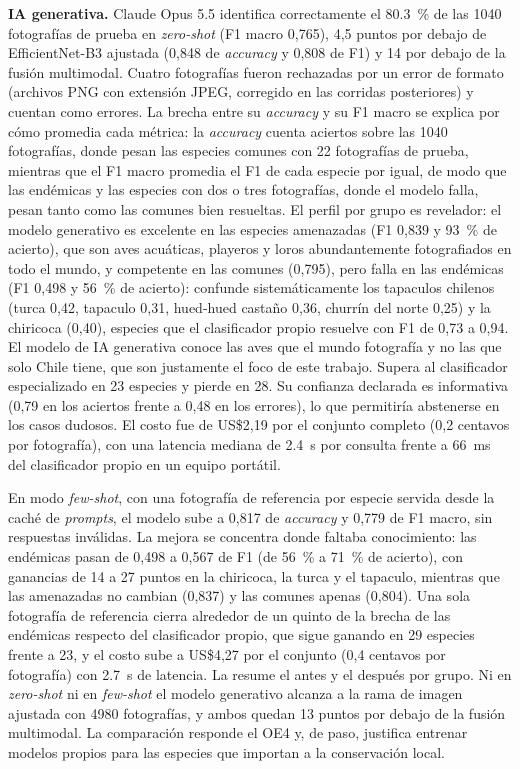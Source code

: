 \textbf{IA generativa.} Claude Opus 5.5 identifica correctamente el
\SI{80,3}{\percent} de las \num{1040} fotografías de prueba en
\textit{zero-shot} (F1 macro 0,765), 4,5 puntos por debajo de
EfficientNet-B3 ajustada (0,848 de \textit{accuracy} y 0,808 de F1) y 14 por
debajo de la fusión multimodal. Cuatro fotografías fueron rechazadas por un
error de formato (archivos PNG con extensión JPEG, corregido en las corridas
posteriores) y cuentan como errores. La brecha entre su \textit{accuracy} y su F1 macro se explica por
cómo promedia cada métrica: la \textit{accuracy} cuenta aciertos sobre las
\num{1040} fotografías, donde pesan las especies comunes con 22 fotografías
de prueba, mientras que el F1 macro promedia el F1 de cada especie por
igual, de modo que las endémicas y las especies con dos o tres fotografías,
donde el modelo falla, pesan tanto como las comunes bien resueltas. El perfil por grupo es revelador: el modelo generativo
es excelente en las especies amenazadas (F1 0,839 y \SI{93}{\percent} de
acierto), que son aves acuáticas, playeros y loros abundantemente
fotografiados en todo el mundo, y competente en las comunes (0,795), pero
falla en las endémicas (F1 0,498 y \SI{56}{\percent} de acierto): confunde
sistemáticamente los tapaculos chilenos (turca 0,42, tapaculo 0,31, hued-hued
castaño 0,36, churrín del norte 0,25) y la chiricoca (0,40), especies que el
clasificador propio resuelve con F1 de 0,73 a 0,94. El modelo de IA generativa conoce las aves que el mundo fotografía y no las que solo Chile
tiene, que son justamente el foco de este trabajo. Supera al clasificador
especializado en 23 especies y pierde en 28. Su confianza declarada es
informativa (0,79 en los aciertos frente a 0,48 en los errores), lo que
permitiría abstenerse en los casos dudosos. El costo fue de US\$2,19 por el
conjunto completo (0,2 centavos por fotografía), con una latencia mediana de
\SI{2,4}{\second} por consulta frente a \SI{66}{\milli\second} del clasificador
propio en un equipo portátil.

En modo \textit{few-shot}, con una fotografía de referencia por especie
servida desde la caché de \textit{prompts}, el modelo sube a 0,817 de
\textit{accuracy} y 0,779 de F1 macro, sin respuestas inválidas. La mejora
se concentra donde faltaba conocimiento: las endémicas pasan de 0,498 a
0,567 de F1 (de \SI{56}{\percent} a \SI{71}{\percent} de acierto), con
ganancias de 14 a 27 puntos en la chiricoca, la turca y el tapaculo, mientras
que las amenazadas no cambian (0,837) y las comunes apenas (0,804). Una sola
fotografía de referencia cierra alrededor de un quinto de la brecha de las
endémicas respecto del clasificador propio, que sigue ganando en 29 especies
frente a 23, y el costo sube a US\$4,27 por el conjunto (0,4 centavos por
fotografía) con \SI{2,7}{\second} de latencia. La  resume el antes y el después por grupo. Ni en
\textit{zero-shot} ni en \textit{few-shot} el modelo generativo alcanza a la
rama de imagen ajustada con \num{4980} fotografías, y ambos quedan 13 puntos
por debajo de la fusión multimodal. La comparación responde el OE4 y, de
paso, justifica entrenar modelos propios para las especies que importan a la
conservación local.

